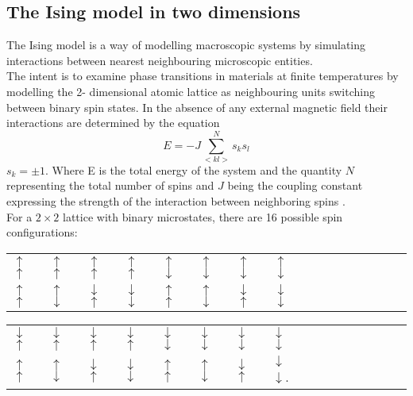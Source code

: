 \documentclass[10pt,a4paper]{article}
\begin{document}
\subsection{The Ising model in two dimensions}
The Ising model is a way of modelling macroscopic systems by simulating interactions between nearest neighbouring microscopic entities.\\The intent is to examine phase transitions in materials at finite temperatures by modelling the 2- dimensional atomic lattice as neighbouring units switching between  binary spin states. In the absence of any external magnetic field their interactions are determined by the equation
\begin{equation} \label{2d-ising energy}
E=-J\sum_{< kl >}^{N}s_ks_l 
\end{equation}
$s_k=\pm 1$. Where E is the total energy of the system and the quantity $N$ representing the total number of spins and $J$ being the coupling constant expressing the strength of the interaction between
neighboring spins \cite{Lecture_Notes_Fall_2015}.\\For a $2\times2$ lattice with binary microstates, there are 16 possible spin configurations:
\begin{table}[H]
\begin{tabular}{llllllllllllllll}
 $\uparrow$ $\uparrow$ &  $\uparrow$ $\uparrow$ &  $\uparrow$ $\uparrow$ &  $\uparrow$ $\uparrow$ &  $\uparrow$ $\downarrow$ &  $\uparrow$ $\downarrow$ & $\uparrow$ $\downarrow$ & $\uparrow$ $\downarrow$ \\
 $\uparrow$ $\uparrow$&  $\uparrow$ $\downarrow$ &  $\downarrow$ $\uparrow$ &  $\downarrow$ $\downarrow$ &  $\uparrow$ $\uparrow$ &  $\uparrow$ $\downarrow$ &  $\downarrow$ $\uparrow$ &  $\downarrow$ $\downarrow$
\end{tabular}
\end{table}
\begin{table}[H]
\begin{tabular}{llllllllllllllll}
 $\downarrow$ $\uparrow$ & $\downarrow$ $\uparrow$ & $\downarrow$ $\uparrow$ & $\downarrow$ $\uparrow$ & $\downarrow$ $\downarrow$ & $\downarrow$ $\downarrow$ &  $\downarrow$ $\downarrow$ & $\downarrow$ $\downarrow$ \\
 $\uparrow$ $\uparrow$ & $\uparrow$ $\downarrow$ & $\downarrow$ $\uparrow$ & $\downarrow$ $\downarrow$ & $\uparrow$ $\uparrow$ & $\uparrow$ $\downarrow$ & $\downarrow$ $\uparrow$ & $\downarrow$ $\downarrow$.
\end{tabular}
\end{table}
\end{document}
